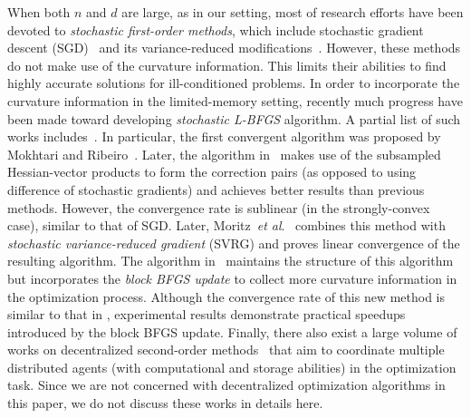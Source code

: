 \documentclass[10pt,twocolumn,journal]{IEEEtran}
\begin{document}
When both $n$ and $d$ are large, as in our setting, most of research efforts have been devoted to {\em stochastic first-order methods}, which include stochastic gradient descent (SGD)~\cite{Bottou_98,Bottou_04} and its variance-reduced modifications~\cite{Johnson_13,Defazio_14,Reza_15,Schmidt_17}. However, these methods do not make use of the curvature information. This limits their {abilities} to find highly accurate solutions for ill-conditioned problems. %
In order to incorporate the curvature information in the limited-memory setting, recently much progress have been  made toward developing {\em stochastic L-BFGS} algorithm. A partial list of such works includes~\cite{Schra_07,Bordes_09,Sohl_14,Mokh_14,Mokh_15,Mokh_17,Byrd_16a,Moritz_16,Gower_16}. 
In particular, the first convergent %
algorithm was proposed by Mokhtari and Ribeiro~\cite{Mokh_14}.  
Later, the algorithm in~\cite{Byrd_16a} makes use of the subsampled Hessian-vector products to form the correction pairs (as opposed to using difference of stochastic gradients) and achieves better results than previous methods. However, the convergence rate is sublinear (in the strongly-convex case), similar to that of SGD. Later, Moritz~{\em et al}.~\cite{Moritz_16} combines this method with {\em stochastic variance-reduced gradient} (SVRG) and proves linear convergence of the resulting algorithm. The algorithm in~\cite{Gower_16} maintains the structure of this algorithm but incorporates the {\em block BFGS update}  to collect more curvature information in the optimization process. Although the convergence rate of this new method is similar to  that in \cite{Moritz_16}, experimental results  demonstrate practical  speedups introduced by the block BFGS update. Finally, there also exist a large volume of works on decentralized %
second-order methods~\cite{Wei_13,Bert_15,Mokh_16,Mokh_16b,Mokh_17b,Eisen_16,Eisen_17} that aim to coordinate multiple distributed agents (with computational and storage abilities) in the optimization task. 
Since we are not concerned with decentralized optimization algorithms in this paper, we do not discuss these works in details here. 
\end{document}
